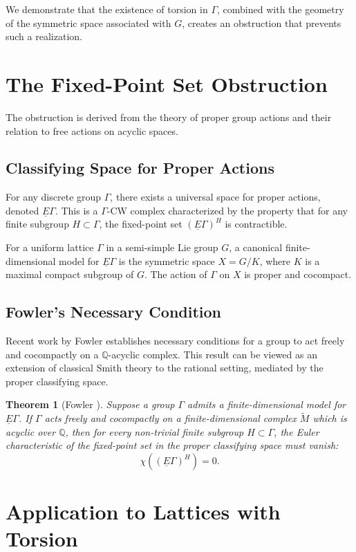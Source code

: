 \documentclass[11pt]{article}
\theoremstyle{plain}
\newtheorem{theorem}{Theorem}
\theoremstyle{definition}
\begin{document}
We demonstrate that the existence of torsion in $\Gamma$, combined with the geometry of the symmetric space associated with $G$, creates an obstruction that prevents such a realization.

\section{The Fixed-Point Set Obstruction}

The obstruction is derived from the theory of proper group actions and their relation to free actions on acyclic spaces.

\subsection{Classifying Space for Proper Actions}
For any discrete group $\Gamma$, there exists a universal space for proper actions, denoted $\underline{E}\Gamma$. This is a $\Gamma$-CW complex characterized by the property that for any finite subgroup $H \subset \Gamma$, the fixed-point set $(\underline{E}\Gamma)^H$ is contractible.

For a uniform lattice $\Gamma$ in a semi-simple Lie group $G$, a canonical finite-dimensional model for $\underline{E}\Gamma$ is the symmetric space $X = G/K$, where $K$ is a maximal compact subgroup of $G$. The action of $\Gamma$ on $X$ is proper and cocompact.

\subsection{Fowler's Necessary Condition}
Recent work by Fowler \cite{Fowler2012} establishes necessary conditions for a group to act freely and cocompactly on a $\mathbb{Q}$-acyclic complex. This result can be viewed as an extension of classical Smith theory to the rational setting, mediated by the proper classifying space.

\begin{theorem}[Fowler \cite{Fowler2012}]
Suppose a group $\Gamma$ admits a finite-dimensional model for $\underline{E}\Gamma$. If $\Gamma$ acts freely and cocompactly on a finite-dimensional complex $\tilde{M}$ which is acyclic over $\mathbb{Q}$, then for every non-trivial finite subgroup $H \subset \Gamma$, the Euler characteristic of the fixed-point set in the proper classifying space must vanish:
\[
\chi\left((\underline{E}\Gamma)^H\right) = 0.
\]
\end{theorem}

\section{Application to Lattices with Torsion}
\end{document}
